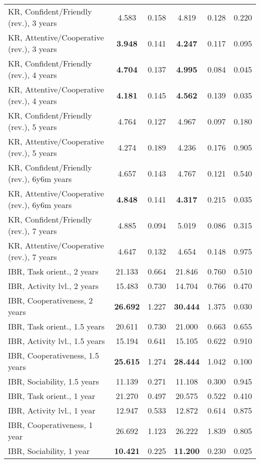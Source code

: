 \begin{tabular}{l c c c c c}
KR, Confident/Friendly (rev.), 3 years & 4.583 & 0.158 &  4.819 & 0.128 & 0.220 \\
KR, Attentive/Cooperative (rev.), 3 years & \textbf{3.948} & 0.141 &  \textbf{4.247} & 0.117 & 0.095 \\
KR, Confident/Friendly (rev.), 4 years & \textbf{4.704} & 0.137 &  \textbf{4.995} & 0.084 & 0.045 \\
KR, Attentive/Cooperative (rev.), 4 years & \textbf{4.181} & 0.145 &  \textbf{4.562} & 0.139 & 0.035 \\
KR, Confident/Friendly (rev.), 5 years & 4.764 & 0.127 &  4.967 & 0.097 & 0.180 \\
KR, Attentive/Cooperative (rev.), 5 years & 4.274 & 0.189 &  4.236 & 0.176 & 0.905 \\
KR, Confident/Friendly (rev.), 6y6m years & 4.657 & 0.143 &  4.767 & 0.121 & 0.540 \\
KR, Attentive/Cooperative (rev.), 6y6m years & \textbf{4.848} & 0.141 &  \textbf{4.317} & 0.215 & 0.035 \\
KR, Confident/Friendly (rev.), 7 years & 4.885 & 0.094 &  5.019 & 0.086 & 0.315 \\
KR, Attentive/Cooperative (rev.), 7 years & 4.647 & 0.132 &  4.654 & 0.148 & 0.975 \\
IBR, Task orient., 2 years & 21.133 & 0.664 &  21.846 & 0.760 & 0.510 \\
IBR, Activity lvl., 2 years & 15.483 & 0.730 &  14.704 & 0.766 & 0.470 \\
IBR, Cooperativeness, 2 years & \textbf{26.692} & 1.227 &  \textbf{30.444} & 1.375 & 0.030 \\
IBR, Task orient., 1.5 years & 20.611 & 0.730 &  21.000 & 0.663 & 0.655 \\
IBR, Activity lvl., 1.5 years & 15.194 & 0.641 &  15.105 & 0.622 & 0.910 \\
IBR, Cooperativeness, 1.5 years & \textbf{25.615} & 1.274 &  \textbf{28.444} & 1.042 & 0.100 \\
IBR, Sociability, 1.5 years & 11.139 & 0.271 &  11.108 & 0.300 & 0.945 \\
IBR, Task orient., 1 year & 21.270 & 0.497 &  20.575 & 0.522 & 0.410 \\
IBR, Activity lvl., 1 year & 12.947 & 0.533 &  12.872 & 0.614 & 0.875 \\
IBR, Cooperativeness, 1 year & 26.692 & 1.123 &  26.222 & 1.839 & 0.805 \\
IBR, Sociability, 1 year & \textbf{10.421} & 0.225 &  \textbf{11.200} & 0.230 & 0.025 \\

\end{tabular}
